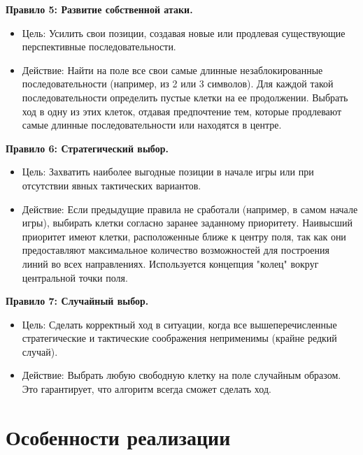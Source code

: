 \documentclass[a4paper]{article}
\begin{document}
\textbf{Правило 5: Развитие собственной атаки.}

\begin{itemize}
	\item Цель: Усилить свои позиции, создавая новые или продлевая существующие перспективные последовательности.
	
	\item Действие: Найти на поле все свои самые длинные незаблокированные последовательности (например, из 2 или 3 символов). Для каждой такой последовательности определить пустые клетки на ее продолжении. Выбрать ход в одну из этих клеток, отдавая предпочтение тем, которые продлевают самые длинные последовательности или находятся в центре.
	
\end{itemize}

\textbf{Правило 6: Стратегический выбор.}

\begin{itemize}
	\item Цель: Захватить наиболее выгодные позиции в начале игры или при отсутствии явных тактических вариантов.
	
	\item Действие: Если предыдущие правила не сработали (например, в самом начале игры), выбирать клетки согласно заранее заданному приоритету. Наивысший приоритет имеют клетки, расположенные ближе к центру поля, так как они предоставляют максимальное количество возможностей для построения линий во всех направлениях. Используется концепция "колец" вокруг центральной точки поля.
	
\end{itemize}

\textbf{Правило 7: Случайный выбор.}

\begin{itemize}
	\item Цель: Сделать корректный ход в ситуации, когда все вышеперечисленные стратегические и тактические соображения неприменимы (крайне редкий случай).
	
	\item Действие: Выбрать любую свободную клетку на поле случайным образом. Это гарантирует, что алгоритм всегда сможет сделать ход.
	
\end{itemize}

\clearpage

\section{Особенности реализации}
\end{document}
